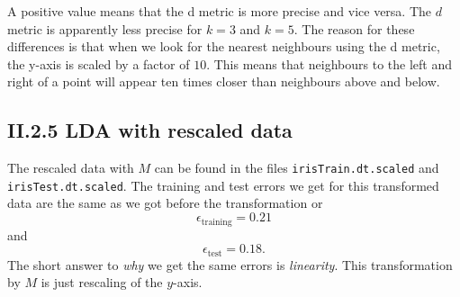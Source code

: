 \documentclass[a4paper,10pt]{article}
\begin{document}
A positive value means that the d metric is more precise and vice versa. The $d$ metric is apparently less precise for $k=3$ and $k=5$.
The reason for these differences is that when we look for the nearest
neighbours using the d metric, the y-axis is scaled by a factor of $10$. This means that neighbours to the left and right of a point will appear ten times
closer than neighbours above and below.



\subsection*{II.2.5 LDA with rescaled data}

The rescaled data with $M$ can be found in the files \verb=irisTrain.dt.scaled= and \verb=irisTest.dt.scaled=. The training and test errors we get for this transformed data are the same as we got before the transformation or 
$$\epsilon_{\text{training}} = 0.21$$
and
$$\epsilon_{\text{test}} = 0.18.$$
The short answer to \emph{why} we get the same errors is \emph{linearity}. This transformation by $M$ is just rescaling of the $y$-axis.

\end{document}
